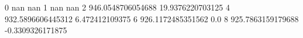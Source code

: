 0 nan nan
1 nan nan
2 946.0548706054688 19.9376220703125
4 932.5896606445312 6.472412109375
6 926.1172485351562 0.0
8 925.7863159179688 -0.3309326171875
